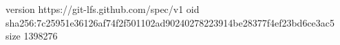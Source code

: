 version https://git-lfs.github.com/spec/v1
oid sha256:7c25951e36126af74f2f501102ad90240278223914be28377f4ef23bd6ce3ac5
size 1398276
